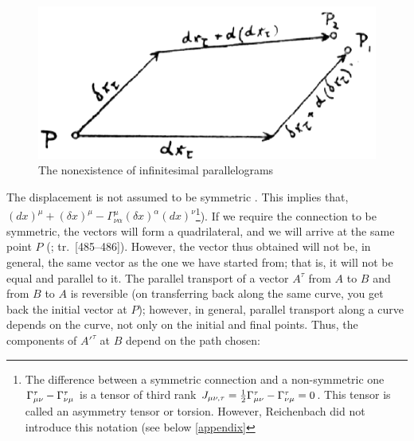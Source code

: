 \documentclass[submitted]{article}
\renewcommand{\rzlap}[2]{(\cite[#1]{Reichenbach1928}; tr.\ [#2])\xspace}
\begin{document}
\begin{figure}
\centering
\includegraphics[scale=0.3]{reichenbachparallelogram.png}
\caption{\label{fig:reichenbachparallelogram} The nonexistence of infinitesimal parallelograms \citep[348]{Reichenbach1928}}
\end{figure}
%
The displacement is not assumed to be symmetric \asym. This implies that,  $(d x)^{\mu}+(\delta x)^{\mu}-\Gamma_{\nu \alpha}^{\mu}(\delta x)^{\alpha}(d x)^{\nu}$\footnote{The difference between a symmetric connection and a non-symmetric one $\Gamma^\tau_{\mu\nu}-\Gamma^\tau_{\nu\mu}$ is a tensor of third rank $J_{\mu\nu,\tau}=\frac{1}{2} \Gamma^\tau_{\mu\nu}-\Gamma^\tau_{\nu\mu}=0$. This tensor is called an asymmetry tensor or torsion. However, Reichenbach did not introduce this notation (see below \cref{appendix}}). If we require the connection to be symmetric, the vectors will form a quadrilateral, and we will arrive at the same point $P$ \rzlap{348--349}{485--486}. However, the vector thus obtained will not be, in general, the same vector as the one we have started from; that is, it will not be equal and parallel to it. The parallel transport of a vector $A^\tau$ from $A$ to $B$ and from $B$ to $A$ is reversible (on transferring back along the same curve, you get back the initial vector at $P$); however, in general, parallel transport along a curve depends on the curve, not only on the initial and final points. Thus, the components of $A'^\tau$ at $B$ depend on the path chosen:
\end{document}
